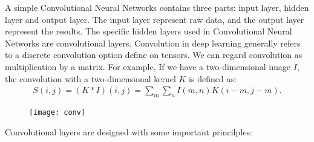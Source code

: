 A simple Convolutional Neural Networks contains three parts: input layer, hidden layer and output layer. The input layer represent raw data, and the output layer represent the results. The specific hidden layers used in Convolutional Neural Networks are convolutional layers. Convolution in deep learning generally refers to a discrete convolution option define on tensors. We can regard convolution as multiplication by a matrix. For example, If we have a two-dimensional image $I$, the convolution with a two-dimensional kernel $K$ is defined as:
\begin{equation}
\begin{aligned}
S(i,j) = (K * I)(i,j) = \sum_m\sum_n I(m,n)K(i-m,j-m).
\end{aligned}
\end{equation}
\begin{figure}
	\centering
	\texttt{[image: conv]}
	\label{fig:5}
\end{figure}
Convolutional layers are designed with some important princilples\cite{goodfellow2016deep}: 
